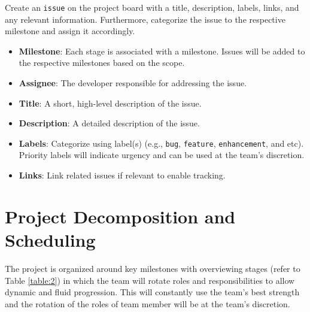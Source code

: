 \documentclass{article}
\begin{document}
Create an \texttt{issue} on the project board with a title, description, labels,
links, and any relevant information. Furthermore, categorize the issue to the
respective milestone and assign it accordingly.

\begin{itemize}
    \item \textbf{Milestone}: Each stage is associated with a milestone. Issues
    will be added to the respective milestones based on the scope.
    \item \textbf{Assignee}: The developer responsible for addressing the issue.
    \item \textbf{Title}: A short, high-level description of the issue.
    \item \textbf{Description}: A detailed description of the issue.
    \item \textbf{Labels}: Categorize using label(s) (e.g., \texttt{bug},
    \texttt{feature}, \texttt{enhancement}, and etc). Priority labels will
    indicate urgency and can be used at the team’s discretion.
    \item \textbf{Links}: Link related issues if relevant to enable tracking.
\end{itemize}


\section{Project Decomposition and Scheduling}

The project is organized around key milestones with overviewing stages (refer to Table \ref{table:2}) in which
the team will rotate roles and responsibilities to allow dynamic and fluid
progression. This will constantly use the team’s best strength and the rotation
of the roles of team member will be at the team’s discretion.

\newpage
\end{document}
